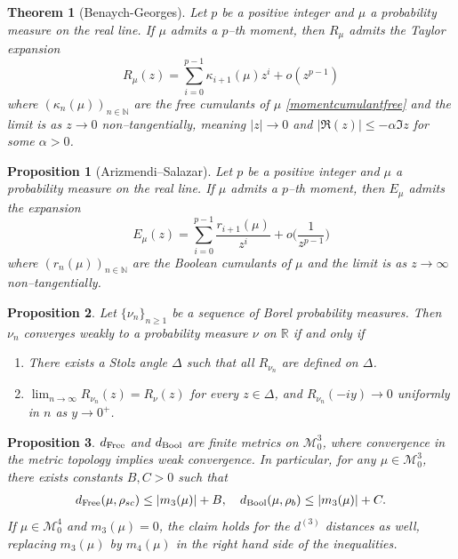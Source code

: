 \documentclass[10pt,a4paper]{amsart}
\newtheorem{theorem}{Theorem}
\newtheorem{proposition}{Proposition}
\begin{document}
 \begin{theorem}[Benaych-Georges]\label{BGtheorem} Let $p$ be a positive integer and $\mu$ a probability measure on the real line. If $\mu$ admits a $p$--th moment, then $R_\mu$ admits the Taylor expansion
 \[
    R_\mu(z)=\sum_{i=0}^{p-1}\kappa_{i+1}(\mu)z^i+o(z^{p-1})
 \]
 where $(\kappa_n(\mu))_{n\in\mathbb{N}}$ are the free cumulants of $\mu$ \eqref{momentcumulantfree} and the limit is as $z\to 0$ non--tangentially, meaning $|z|\to 0$ and $|\Re(z)|\leq -\alpha \Im{z}$ for some $\alpha>0$.
 \end{theorem}

\begin{proposition}[Arizmendi--Salazar]\label{Kexpansion} Let $p$ be a positive integer and $\mu$ a probability measure on the real line. If $\mu$ admits a $p$--th moment, then $E_\mu$ admits the expansion
\[
    E_\mu(z)=\sum_{i=0}^{p-1}\frac{r_{i+1}(\mu)}{z^i}+o\bigg(\frac{1}{z^{p-1}}\bigg) 
\]
where $(r_n(\mu))_{n\in\mathbb{N}}$ are the Boolean cumulants of $\mu$ and the limit is as $z\to \infty$ non--tangentially.
\end{proposition}

\begin{proposition}\label{Rconv}
        Let $\{\nu_n\}_{n\geq 1}$ be a sequence of Borel probability measures. Then $\nu_n$ converges weakly to a probability measure $\nu$ on $\mathbb{R}$ if and only if 
    \begin{enumerate}
        \item There exists a Stolz angle $\Delta$ such that all $R_{\nu_n}$ are defined on $\Delta$.
        \item $\lim_{n\to\infty}R_{\nu_n}(z)=R_\nu(z)$ for every $z\in \Delta$, and $R_{\nu_n}(-iy)\to 0$ uniformly in $n$ as $y\to 0^+$. 
    \end{enumerate}
\end{proposition}

\begin{proposition}\label{qe:finite1d}
    $d_{\text{\normalfont Free}}$ and $d_{\text{\normalfont Bool}}$ are finite metrics on $\mathcal{M}_0^3$, where convergence in the metric topology implies weak convergence.
    In particular, for any $\mu\in \mathcal{M}_0^3$, there exists constants $B, C>0$ such that
    \begin{align}\label{bound}
         d_{\text{\normalfont Free}}(\mu, \rho_{sc})\leq |m_3(\mu)|+B,\quad d_{\text{\normalfont Bool}}(\mu, \rho_b)\leq |m_3(\mu)|+C.
    \end{align}
    If $\mu\in \mathcal{M}_0^{4}$ and $m_3(\mu)=0$, the claim holds for the $d^{(3)}$ distances as well, replacing $m_3(\mu)$ by $m_4(\mu)$ in the right hand side of the inequalities.
\end{proposition}
\end{document}
